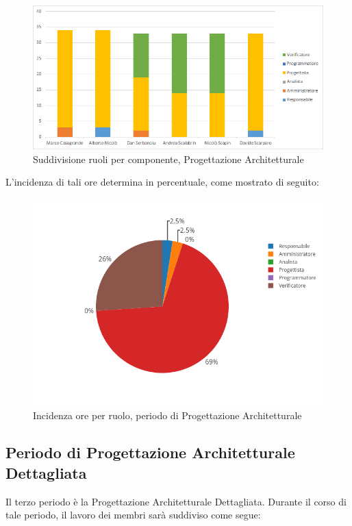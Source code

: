 \begin{figure}[H]
	\centering
	\includegraphics[scale=0.6]{img/6-2.png}
	\caption{Suddivisione ruoli per componente, Progettazione Architetturale}
\end{figure}

L'incidenza di tali ore determina in percentuale, come mostrato di seguito:
\begin{figure}[H]
	\centering
	\includegraphics[scale=0.6]{img/ProgettazioneArchitetturale.png}
	\caption{Incidenza ore per ruolo, periodo di Progettazione Architetturale}
\end{figure}

\newpage
\subsection{Periodo di Progettazione Architetturale Dettagliata}
Il terzo periodo è la Progettazione Architetturale Dettagliata. Durante il corso di tale periodo, il lavoro dei membri sarà suddiviso come segue:

